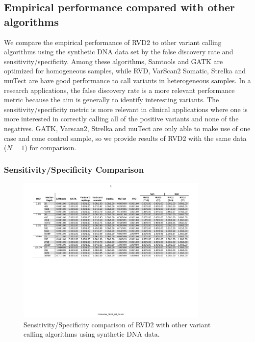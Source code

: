 \documentclass{bioinfo}
\begin{document}
\subsection{Empirical performance compared with other algorithms}\label{sec:comparison}

We compare the empirical performance of RVD2 to other variant calling algorithms using the synthetic DNA data set by the false discovery rate and sensitivity/specificity. Among these algorithms, Samtools and GATK are optimized for homogeneous samples, while RVD, VarScan2 Somatic, Strelka and muTect are have good performance to call variants in heterogeneous samples. In a research applications, the false discovery rate is a more relevant performance metric because the aim is generally to identify interesting variants. The sensitivity/specificity metric is more relevant in clinical applications where one is more interested in correctly calling all of the positive variants and none of the negatives. GATK, Varscan2, Strelka and muTect are only able to make use of one case and cone control sample, so we provide results of RVD2 with the same data ($N=1$) for comparison.




\subsubsection*{Sensitivity/Specificity Comparison}

\begin{figure}[!htpb]
\centering
\vspace{-10pt}
\includegraphics[width=0.84\textwidth]{pdf_figs/comparison_table_ss.pdf}
\caption{Sensitivity/Specificity comparison of RVD2 with other variant calling algorithms using synthetic DNA data.}
\vspace{-10pt}
\label{tbl:comparison_ss}
\end{figure}
\end{document}

